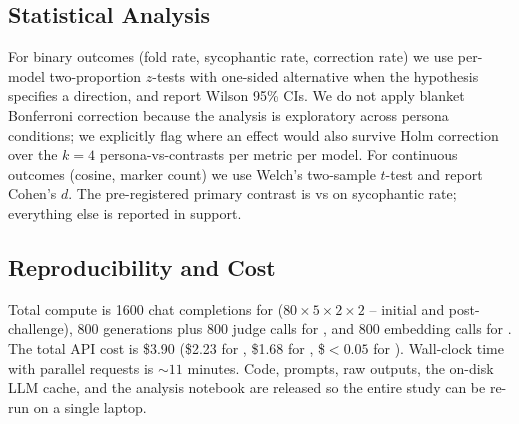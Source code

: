 \subsection{Statistical Analysis}
\label{sec:method:stats}

For binary outcomes (fold rate, sycophantic rate, correction rate) we use per-model two-proportion \(z\)-tests with one-sided alternative when the hypothesis specifies a direction, and report Wilson 95\% CIs. We do not apply blanket Bonferroni correction because the analysis is exploratory across persona conditions; we explicitly flag where an effect would also survive Holm correction over the \(k=4\) persona-vs-\pnone contrasts per metric per model. For continuous outcomes (cosine, marker count) we use Welch's two-sample \(t\)-test and report Cohen's \(d\). The pre-registered primary contrast is \pbelief vs \pnone on \etwo sycophantic rate; everything else is reported in support.

\subsection{Reproducibility and Cost}
\label{sec:method:repro}

Total compute is 1600 chat completions for \eone (\(80 \times 5 \times 2 \times 2\) -- initial and post-challenge), 800 generations plus 800 judge calls for \etwo, and 800 embedding calls for \ethree. The total API cost is \$3.90 (\$2.23 for \eone, \$1.68 for \etwo, \$\(<0.05\) for \ethree). Wall-clock time with parallel requests is \(\sim 11\) minutes. Code, prompts, raw outputs, the on-disk LLM cache, and the analysis notebook are released so the entire study can be re-run on a single laptop.
